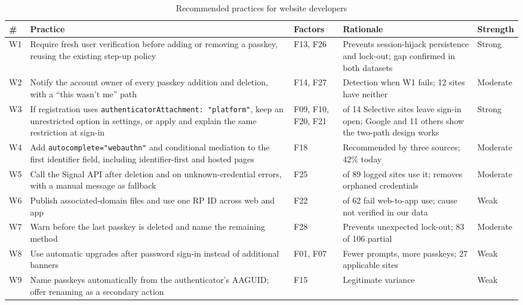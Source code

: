 \documentclass[letterpaper,twocolumn,10pt]{article}
\begin{document}
\begin{table}[t]\centering\footnotesize\setlength{\tabcolsep}{3pt}\caption{Recommended practices for website developers}\label{tab:9}
\begin{tabularx}{\textwidth}{l>{\raggedright\arraybackslash}X>{\raggedright\arraybackslash}p{1.6cm}>{\raggedright\arraybackslash}p{4cm}>{\raggedright\arraybackslash}p{1.3cm}}\toprule
\textbf{\#} & \textbf{Practice} & \textbf{Factors} & \textbf{Rationale} & \textbf{Strength} \\ \midrule
W1 & Require fresh user verification before adding or removing a passkey, reusing the existing step-up policy & F13, F26 & Prevents session-hijack persistence and lock-out; gap confirmed in both datasets & Strong \\
W2 & Notify the account owner of every passkey addition and deletion, with a ``this wasn't me'' path & F14, F27 & Detection when W1 fails; 12 sites have neither & Moderate \\
W3 & If registration uses \texttt{authenticatorAttachment:\ "platform"}, keep an unrestricted option in settings, or apply and explain the same restriction at sign-in & F09, F10, F20, F21 & 11 of 14 Selective sites leave sign-in open; Google and 11 others show the two-path design works & Strong \\
W4 & Add \texttt{autocomplete="webauthn"} and conditional mediation to the first identifier field, including identifier-first and hosted pages & F18 & Recommended by three sources; 42\% today & Moderate \\
W5 & Call the Signal API after deletion and on unknown-credential errors, with a manual message as fallback & F25 & 5 of 89 logged sites use it; removes orphaned credentials & Moderate \\
W6 & Publish associated-domain files and use one RP ID across web and app & F22 & 23 of 62 fail web-to-app use; cause not verified in our data & Weak \\
W7 & Warn before the last passkey is deleted and name the remaining method & F28 & Prevents unexpected lock-out; 83 of 106 partial & Moderate \\
W8 & Use automatic upgrades after password sign-in instead of additional banners & F01, F07 & Fewer prompts, more passkeys; 27 applicable sites & Weak \\
W9 & Name passkeys automatically from the authenticator's AAGUID; offer renaming as a secondary action & F15 & Legitimate variance & Weak \\
\bottomrule\end{tabularx}\end{table}
\end{document}
